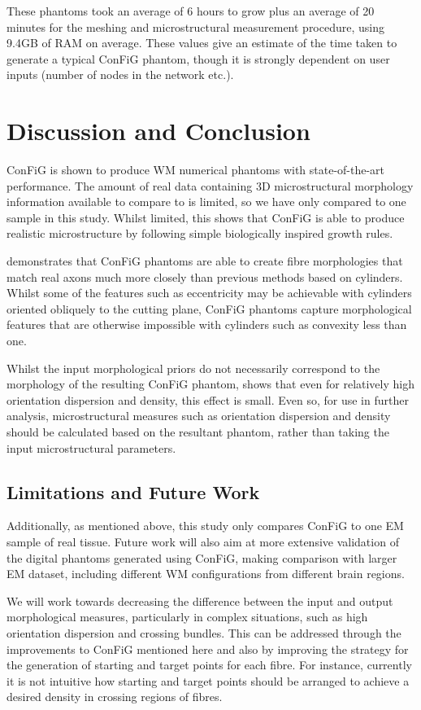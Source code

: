 These phantoms took an average of 6 hours to grow plus an average of 20 minutes for the meshing and microstructural measurement procedure, using 9.4GB of RAM on average. These values give an estimate of the time taken to generate a typical ConFiG phantom, though it is strongly dependent on user inputs (number of nodes in the network etc.).


\section{Discussion and Conclusion}
\label{sec:micro_discussion}

ConFiG is shown to produce WM numerical phantoms with state-of-the-art performance. The amount of real data containing 3D microstructural morphology information available to compare to is limited, so we have only compared to one sample in this study. Whilst limited, this shows that ConFiG is able to produce realistic microstructure by following simple biologically inspired growth rules.

 demonstrates that ConFiG phantoms are able to create fibre morphologies that match real axons much more closely than previous methods based on cylinders. Whilst some of the features such as eccentricity may be achievable with cylinders oriented obliquely to the cutting plane, ConFiG phantoms capture morphological features that are otherwise impossible with cylinders such as convexity less than one.

Whilst the input morphological priors do not necessarily correspond to the morphology of the resulting ConFiG phantom,  shows that even for relatively high orientation dispersion and density, this effect is small. Even so, for use in further analysis, microstructural measures such as orientation dispersion and density should be calculated based on the resultant phantom, rather than taking the input microstructural parameters.

\subsection{Limitations and Future Work}
\label{sec:micro_limitations}

Additionally, as mentioned above, this study only compares ConFiG to one EM sample of real tissue. Future work will also aim at more extensive validation of the digital phantoms generated using ConFiG, making comparison with larger EM dataset, including different WM configurations from different brain regions.

We will work towards decreasing the difference between the input and output morphological measures, particularly in complex situations, such as high orientation dispersion and crossing bundles. This can be addressed through the improvements to ConFiG mentioned here and also by improving the strategy for the generation of starting and target points for each fibre. For instance, currently it is not intuitive how starting and target points should be arranged to achieve a desired density in crossing regions of fibres.
